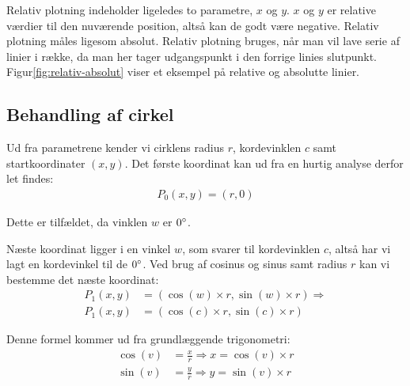 Relativ plotning indeholder ligeledes to parametre, $x$ og $y$. $x$ og $y$ er
relative værdier til den nuværende position, altså kan de godt være
negative. Relativ plotning måles ligesom absolut. Relativ plotning
bruges, når man vil lave serie af linier i række, da man her tager
udgangspunkt i den forrige linies
slutpunkt. Figur\vref{fig:relativ-absolut} viser et eksempel på
relative og absolutte linier.

\subsection{Behandling af cirkel}
\label{sc:matematik-cirkel}

Ud fra parametrene kender vi cirklens radius $r$, kordevinklen $c$ samt startkoordinater
$(x, y)$. Det første koordinat kan ud fra en hurtig analyse derfor let
findes:
\begin{align*}
  P_0(x, y) = (r, 0)
\end{align*}


Dette er tilfældet, da vinklen $w$ er $0^\circ$.

Næste koordinat ligger i en vinkel $w$, som svarer til kordevinklen
$c$, altså har vi lagt en kordevinkel til de $0^\circ$. Ved brug af
cosinus og sinus samt radius $r$ kan vi bestemme det næste koordinat:
\begin{align}
  P_1(x, y) &= \left( \cos(w) \times r, \sin(w) \times r \right) \Rightarrow \nonumber \\
  P_1(x, y) &= \left( \cos(c) \times r, \sin(c) \times r \right) \label{eq:8.1}
\end{align}
 
Denne formel kommer ud fra grundlæggende trigonometri:
\begin{align*}
  \cos(v) &= \frac{x}{r} \Rightarrow x = \cos(v)\times r \\
  \sin(v) &= \frac{y}{r} \Rightarrow y = \sin(v)\times r
\end{align*}
 
